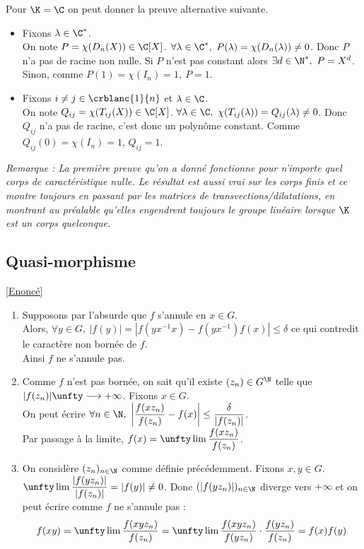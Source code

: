 \documentclass[8pt]{book}
\begin{document}
	Pour $\K=\C$ on peut donner la preuve alternative suivante.
	\begin{itemize}
		\item Fixons $\lambda\in \C^*$.\\
		On note $P=\chi(D_n(X))\in \C[X]$. $\forall \lambda\in \C^*,\ P(\lambda)=\chi(D_n(\lambda))\ne 0$. Donc $P$ n'a pas de racine non nulle. Si $P$ n'est pas constant alors $\exists d\in \N^*,\ P=X^d$. Sinon, comme $P(1)=\chi(I_n)=1,\ P=1$.
		\item Fixons $i\ne j\in \crblanc{1}{n}$ et $\lambda\in \C$.\\
		On note $Q_{ij}=\chi(T_{ij}(X))\in \C[X]$. $\forall \lambda\in \C,\ \chi(T_{ij}(\lambda))=Q_{ij}(\lambda)\ne 0$. Donc $Q_{ij}$ n'a pas de racine, c'est donc un polynôme constant. Comme $Q_{ij}(0)=\chi(I_n)=1$, $Q_{ij}=1$.
	\end{itemize}
	\textit{Remarque : La première preuve qu'on a donné fonctionne pour n'importe quel corps de caractéristique nulle. Le résultat est aussi vrai sur les corps finis et ce montre toujours en passant par les matrices de transvections/dilatations, en montrant au préalable qu'elles engendrent toujours le groupe linéaire lorsque $\K$ est un corps quelconque.}
	
	\subsection{Quasi-morphisme }
	\label{Quasi-morphisme corrigé}
	\textcolor{blue}{\hyperref[Quasi-morphisme]{[Enoncé]}}\\
	\begin{enumerate}[leftmargin=*]
		\item Supposons par l'absurde que $f$ s'annule en $x\in G$.\\
		Alors, $\forall y\in G,\ |f(y)|=|f(yx^{-1}x)-f(yx^{-1})f(x)|\leq \delta$ ce qui contredit le caractère non bornée de $f$.\\
		Ainsi $f$ ne s'annule pas.
		\item Comme $f$ n'est pas bornée, on sait qu'il existe $(z_n)\in G^\N$ telle que $|f(z_n)|\unfty\longrightarrow+\infty$. Fixons $x\in G$.\\
		On peut écrire $\forall n\in \N,\ \displaystyle\left|\frac{f(xz_n)}{f(z_n)}-f(x)\right|\leq \frac{\delta}{|f(z_n)|}$.\\
		Par passage à la limite, $f(x)=\unfty\lim\displaystyle\frac{f(xz_n)}{f(z_n)}$.
		\item On considère $(z_n)_{n\in \N}$ comme définie précédemment. Fixons $x,y\in G$.\\
		$\unfty\lim\displaystyle\frac{|f(yz_n)|}{|f(z_n)|}=|f(y)|\ne 0$. Donc $(|f(yz_n)|)_{n\in \N}$ diverge vers $+\infty$ et on peut écrire comme $f$ ne s'annule pas :
		$$f(xy)=\unfty\lim\displaystyle\frac{f(xyz_n)}{f(z_n)}=\unfty\lim\frac{f(xyz_n)}{f(yz_n)}\cdot\frac{f(yz_n)}{f(z_n)}=f(x)f(y)$$
	\end{enumerate}
	
\end{document}
